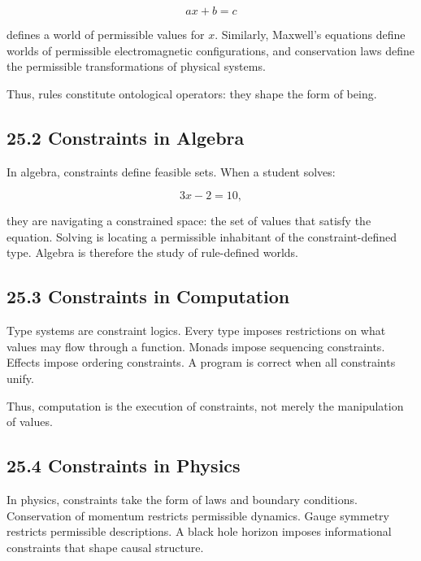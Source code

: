 \documentclass[12pt,letterpaper]{article}
\theoremstyle{remark}
\begin{document}
\[
ax + b = c
\]

defines a world of permissible values for \(x\). Similarly, Maxwell’s equations define worlds of permissible electromagnetic configurations, and conservation laws define the permissible transformations of physical systems.

Thus, rules constitute ontological operators: they shape the form of being.

\subsection{25.2 Constraints in Algebra}

In algebra, constraints define feasible sets. When a student solves:

\[
3x - 2 = 10,
\]

they are navigating a constrained space: the set of values that satisfy the equation. Solving is locating a permissible inhabitant of the constraint-defined type. Algebra is therefore the study of rule-defined worlds.

\subsection{25.3 Constraints in Computation}

Type systems are constraint logics. Every type imposes restrictions on what values may flow through a function. Monads impose sequencing constraints. Effects impose ordering constraints. A program is correct when all constraints unify.

Thus, computation is the execution of constraints, not merely the manipulation of values.

\subsection{25.4 Constraints in Physics}

In physics, constraints take the form of laws and boundary conditions. Conservation of momentum restricts permissible dynamics. Gauge symmetry restricts permissible descriptions. A black hole horizon imposes informational constraints that shape causal structure.
\end{document}
